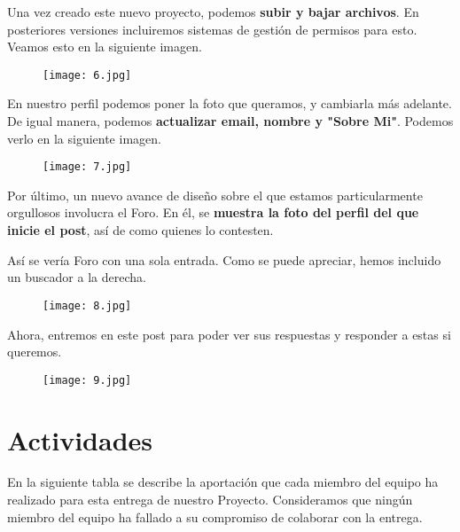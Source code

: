 \documentclass[12pt]{report}
\begin{document}
Una vez creado este nuevo proyecto, podemos \textbf{subir y bajar archivos}. En posteriores versiones incluiremos sistemas de gestión de permisos para esto. Veamos esto en la siguiente imagen.
\newpage

\begin{figure}[!h]
 \centering
  \texttt{[image: 6.jpg]}
\end{figure}

En nuestro perfil podemos poner la foto que queramos, y cambiarla más adelante. De igual manera, podemos \textbf{actualizar email, nombre y "Sobre Mi"}. Podemos verlo en la siguiente imagen.

\begin{figure}[!h]
 \centering
  \texttt{[image: 7.jpg]}
\end{figure}

Por último, un nuevo avance de diseño sobre el que estamos particularmente orgullosos involucra el Foro. En él, se \textbf{muestra la foto del perfil del que inicie el post}, así de como quienes lo contesten. 

Así se vería Foro con una sola entrada. Como se puede apreciar, hemos incluido un buscador a la derecha.

\begin{figure}[!h]
 \centering
  \texttt{[image: 8.jpg]}
\end{figure}

Ahora, entremos en este post para poder ver sus respuestas y responder a estas si queremos.

\begin{figure}[!h]
 \centering
  \texttt{[image: 9.jpg]}
\end{figure}

\section{Actividades}

En la siguiente tabla se describe la aportación que cada miembro del equipo ha realizado para esta entrega de nuestro Proyecto. Consideramos que ningún miembro del equipo ha fallado a su compromiso de colaborar con la entrega.
\end{document}
